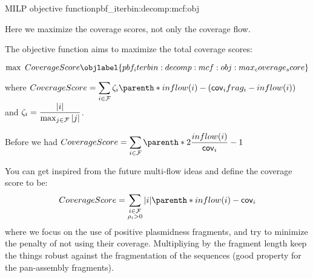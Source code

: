 \begin{definition}{\MCF{} MILP objective function}{pbf_iterbin:decomp:mcf:obj}
  \begin{newfeatbox}
    Here we maximize the coverage scores, not only the coverage flow.
  \end{newfeatbox}
  The objective function aims to maximize the total coverage scores:
  \begin{Objective}
    \begin{equation}
      \max ~ CoverageScore
      \objlabel{pbf_iterbin:decomp:mcf:obj:max_coverage_score} %
    \end{equation}
  \end{Objective}
  where \(
    \displaystyle CoverageScore = %
    \sum_{i \in \Fragments{}} \fzeta{i} \parenth*{ inflow(i) - (\cov{i}\frag{i} - inflow(i)) }
  \) and \( \displaystyle \zeta_{i} = \frac{ |i| }{ \max_{j \in \mathcal{F}{}} |j| } \).

  \begin{notebox}
    Before we had \(
      \displaystyle CoverageScore = %
      \sum_{i \in \Fragments{}} \parenth*{2 \frac{inflow(i)}{\cov{i}} - 1}
    \)
  \end{notebox}

  \begin{ideabox}
    You can get inspired from the future multi-flow ideas and define the coverage score to be:
    \[
      CoverageScore = \sum_{
        \substack{
          i \in \Fragments{} \\
          \plm{i} > 0
        }
      } |i| \parenth*{ inflow(i) - \cov{i} }
    \]
    where we focus on the use of positive plasmidness fragments, and try to minimize the penalty of not using their coverage.
    Multipliying by the fragment length keep the things robust against the fragmentation of the sequences (good property for the pan-assembly fragments).
  \end{ideabox}
\end{definition}